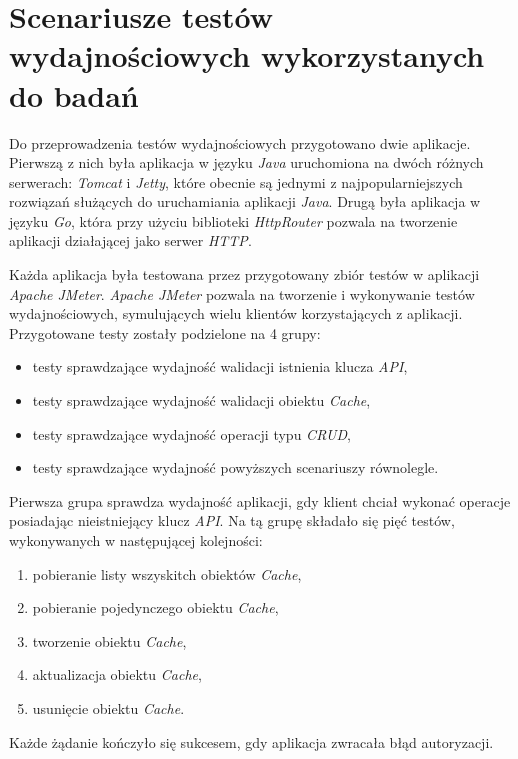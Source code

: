 \section{Scenariusze testów wydajnościowych wykorzystanych do badań}

Do przeprowadzenia testów wydajnościowych przygotowano dwie aplikacje. Pierwszą z nich była aplikacja w języku \textsl{Java} uruchomiona na dwóch różnych serwerach: \textsl{Tomcat} i \textsl{Jetty}, które obecnie są jednymi z najpopularniejszych rozwiązań służących do uruchamiania aplikacji \textsl{Java}. Drugą była aplikacja w języku \textsl{Go}, która przy użyciu biblioteki \textsl{HttpRouter} \cite{httprouter} pozwala na tworzenie aplikacji działającej jako serwer \textsl{HTTP}.

Każda aplikacja była testowana przez przygotowany zbiór testów w aplikacji \textsl{Apache JMeter}. \textsl{Apache JMeter} pozwala na tworzenie i wykonywanie testów wydajnościowych, symulujących wielu klientów korzystających z aplikacji. Przygotowane testy zostały podzielone na 4 grupy:
\begin{itemize}
    \item testy sprawdzające wydajność walidacji istnienia klucza \textsl{API},
    \item testy sprawdzające wydajność walidacji obiektu \textsl{Cache},
    \item testy sprawdzające wydajność operacji typu \textsl{CRUD},
    \item testy sprawdzające wydajność powyższych scenariuszy równolegle.
\end{itemize}

Pierwsza grupa sprawdza wydajność aplikacji, gdy klient chciał wykonać operacje posiadając nieistniejący klucz \textsl{API}. Na tą grupę składało się pięć testów, wykonywanych w następującej kolejności:
\begin{enumerate}
    \item pobieranie listy wszyskitch obiektów \textsl{Cache},
    \item pobieranie pojedynczego obiektu \textsl{Cache},
    \item tworzenie obiektu \textsl{Cache},
    \item aktualizacja obiektu \textsl{Cache}, 
    \item usunięcie obiektu \textsl{Cache}.
\end{enumerate}
Każde żądanie kończyło się sukcesem, gdy aplikacja zwracała błąd autoryzacji.

